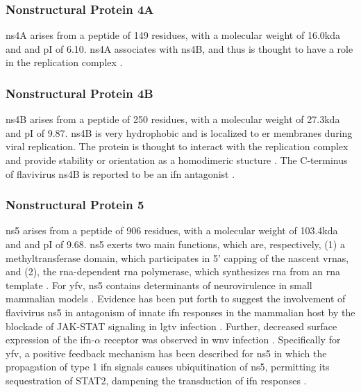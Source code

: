 \subsubsection{Nonstructural Protein 4A}
\Gls{ns}4A arises from a peptide of 149 residues, with a molecular weight of 16.0\gls{kda} and and pI of 6.10. \Gls{ns}4A associates with \gls{ns}4B, and thus is thought to have a role in the replication complex \parencite{Zou:2015dl}.

\subsubsection{Nonstructural Protein 4B}
\Gls{ns}4B arises from a peptide of 250 residues, with a molecular weight of 27.3\gls{kda} and pI of 9.87. \Gls{ns}4B is very hydrophobic and is localized to \gls{er} membranes during viral replication. The protein is thought to interact with the replication complex and provide stability or orientation as a homodimeric stucture \parencite{Zou:2014ku}. The C-terminus of flavivirus \gls{ns}4B is reported to be an \gls{ifn} antagonist \parencite{MunozJordan:2005ia}.

\subsubsection{Nonstructural Protein 5}
\Gls{ns}5 arises from a peptide of 906 residues, with a molecular weight of 103.4\gls{kda} and and pI of 9.68. \Gls{ns}5 exerts two main functions, which are, respectively, (1) a methyltransferase domain, which participates in 5' capping of the nascent \glspl{vrna}, and (2), the \gls{rna}-dependent \gls{rna} polymerase, which synthesizes \gls{rna} from an \gls{rna} template \parencite{Monath:2013cu}. For \gls{yfv}, \gls{ns}5 contains determinants of neurovirulence in small mammalian models \parencite{Xie:1998wq}. Evidence has been put forth to suggest the involvement of flavivirus \gls{ns}5 in antagonism of innate \gls{ifn} responses in the mammalian host by the blockade of JAK-STAT signaling in \gls{lgtv} infection \parencite{Best:2005kg}. Further, decreased surface expression of the \gls{ifn}-$\alpha$ receptor was observed in \gls{wnv} infection \parencite{Lubick:2015fg}. Specifically for \gls{yfv}, a positive feedback mechanism has been described for \gls{ns}5 in which the propagation of type 1 \gls{ifn} signals causes ubiquitination of \gls{ns}5, permitting its sequestration of STAT2, dampening the transduction of \gls{ifn} responses \parencite{LaurentRolle:2014hn}. 

